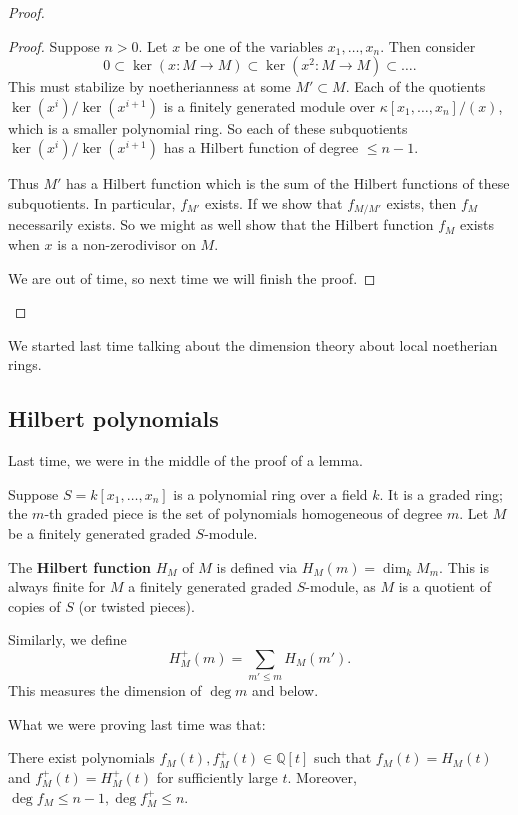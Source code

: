 \begin{proof}
\begin{proof}
Suppose $n > 0$. Let $x$ be one of the variables $x_1, \dots, x_n$. Then
consider
\[ 0 \subset \ker( x: M \to M) \subset \ker (x^2: M \to M) \subset \dots.  \]
This must stabilize by noetherianness at some $M' \subset M$. Each of the
quotients $\ker( x^i)/\ker (x^{i+1})$ is a finitely generated module over $\kappa[x_1, \dots,
x_n]/(x)$, which is a smaller polynomial ring.  So each of these subquotients
$\ker (x^i)/\ker (x^{i+1})$ has a Hilbert function of degree $\leq n-1$. 

Thus $M'$ has a Hilbert function which is the sum of the Hilbert functions of
these subquotients. In particular, $f_{M'}$ exists. If we show that $f_{M/M'}$
exists, then $f_M$ necessarily exists. So we might as well show that the
Hilbert function $f_M$ exists when $x$ is  a non-zerodivisor on $M$. 

We are out of time, so next time we will finish the proof. 
\end{proof} 
\end{proof} 

We started last time talking about the dimension theory about local noetherian
rings. 

\subsection{Hilbert polynomials}
Last time, we were in the middle of the proof of a lemma. 

Suppose $S = k[x_1, \dots, x_n]$ is a polynomial ring over a field $k$. It is a
graded ring; the $m$-th graded piece is the set of polynomials homogeneous of
degree $m$. Let $M$ be a finitely generated graded $S$-module. 

\begin{definition} 
The \textbf{Hilbert function} $H_M$ of $M$ is defined via $H_M(m) = \dim_k
M_m$. This is always finite for $M$ a finitely generated graded $S$-module, as $M$ is a
quotient of copies of $S$ (or twisted pieces).

Similarly, we define
\[ H_M^+(m) = \sum_{m' \leq m} H_M(m').  \]
This measures the dimension of $\deg m$ and below.
\end{definition} 

What we were proving last time was that:

\begin{proposition} 
There exist polynomials $f_M(t), f_M^+(t) \in \mathbb{Q}[t]$ such that $f_M(t) = H_M(t)$ and
$f_M^+(t) = H_M^+(t)$ for sufficiently large $t$. Moreover, $\deg f_M \leq n-1,
\deg f_M^+ \leq n$.
\end{proposition} 

